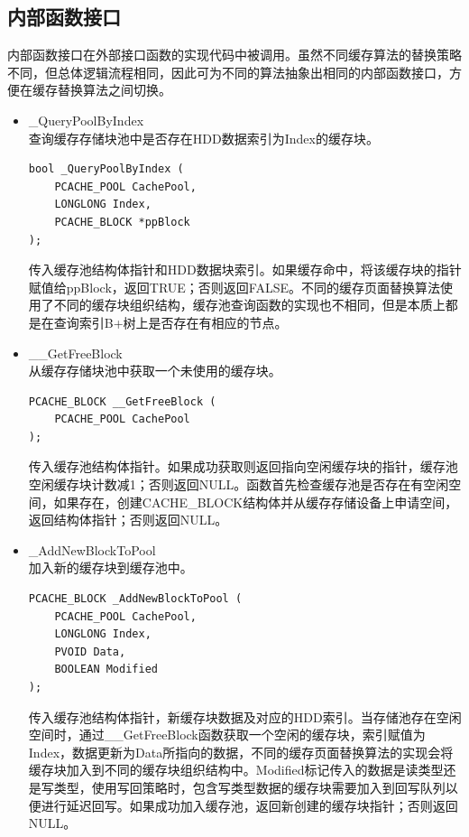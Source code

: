 \subsection{内部函数接口}

内部函数接口在外部接口函数的实现代码中被调用。虽然不同缓存算法的替换策略不同，但总体逻辑流程相同，因此可为不同的算法抽象出相同的内部函数接口，方便在缓存替换算法之间切换。

\begin{itemize}

\item \_QueryPoolByIndex
\\查询缓存存储块池中是否存在HDD数据索引为Index的缓存块。
\begin{lstlisting}
bool _QueryPoolByIndex (
    PCACHE_POOL CachePool,
    LONGLONG Index,
    PCACHE_BLOCK *ppBlock
);
\end{lstlisting}
传入缓存池结构体指针和HDD数据块索引。如果缓存命中，将该缓存块的指针赋值给ppBlock，返回TRUE；否则返回FALSE。不同的缓存页面替换算法使用了不同的缓存块组织结构，缓存池查询函数的实现也不相同，但是本质上都是在查询索引B+树上是否存在有相应的节点。

\item \_\_GetFreeBlock
\\从缓存存储块池中获取一个未使用的缓存块。
\begin{lstlisting}
PCACHE_BLOCK __GetFreeBlock (
    PCACHE_POOL CachePool
);
\end{lstlisting}
传入缓存池结构体指针。如果成功获取则返回指向空闲缓存块的指针，缓存池空闲缓存块计数减1；否则返回NULL。函数首先检查缓存池是否存在有空闲空间，如果存在，创建CACHE\_BLOCK结构体并从缓存存储设备上申请空间，返回结构体指针；否则返回NULL。

\item \_AddNewBlockToPool
\\加入新的缓存块到缓存池中。
\begin{lstlisting}
PCACHE_BLOCK _AddNewBlockToPool (
    PCACHE_POOL CachePool,
    LONGLONG Index,
    PVOID Data,
    BOOLEAN Modified
);
\end{lstlisting}
传入缓存池结构体指针，新缓存块数据及对应的HDD索引。当存储池存在空闲空间时，通过\_\_GetFreeBlock函数获取一个空闲的缓存块，索引赋值为Index，数据更新为Data所指向的数据，不同的缓存页面替换算法的实现会将缓存块加入到不同的缓存块组织结构中。Modified标记传入的数据是读类型还是写类型，使用写回策略时，包含写类型数据的缓存块需要加入到回写队列以便进行延迟回写。如果成功加入缓存池，返回新创建的缓存块指针；否则返回NULL。


\end{itemize}
